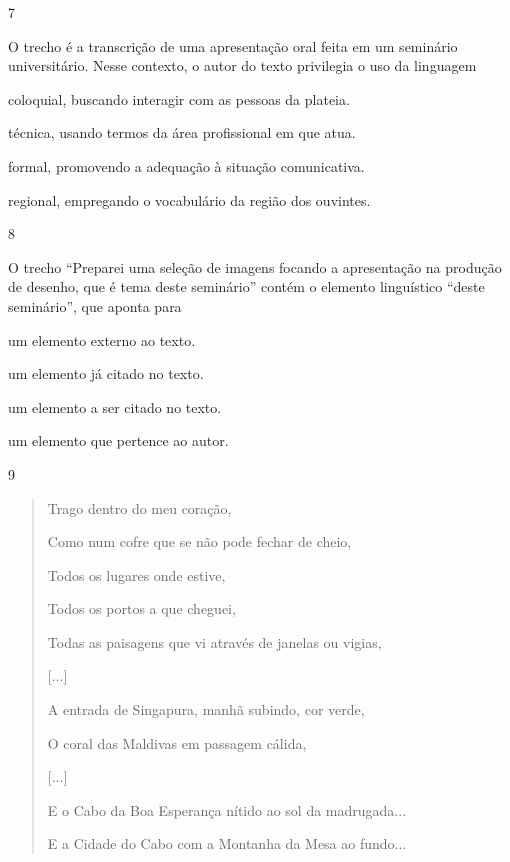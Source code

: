 
\num{7}

O trecho é a transcrição de uma apresentação oral feita em um seminário
universitário. Nesse contexto, o autor do texto privilegia o uso da
linguagem

\begin{escolha}
\item
  coloquial, buscando interagir com as pessoas da plateia.
\item
  técnica, usando termos da área profissional em que atua.
\item
  formal, promovendo a adequação à situação comunicativa.
\item
  regional, empregando o vocabulário da região dos ouvintes.
\end{escolha}

\num{8}

O trecho ``Preparei uma seleção de imagens focando a apresentação na
produção de desenho, que é tema deste seminário'' contém o elemento
linguístico ``deste seminário'', que aponta para

\begin{escolha}
\item um elemento externo ao texto.

\item um elemento já citado no texto.

\item um elemento a ser citado no texto.

\item um elemento que pertence ao autor.
\end{escolha}

\num{9}

\begin{quote}
Trago dentro do meu coração,

Como num cofre que se não pode fechar de cheio,

Todos os lugares onde estive,

Todos os portos a que cheguei,

Todas as paisagens que vi através de janelas ou vigias,

{[}...{]}

A entrada de Singapura, manhã subindo, cor verde,

O coral das Maldivas em passagem cálida,

{[}...{]}

E o Cabo da Boa Esperança nítido ao sol da madrugada...

E a Cidade do Cabo com a Montanha da Mesa ao fundo...
\end{quote}

